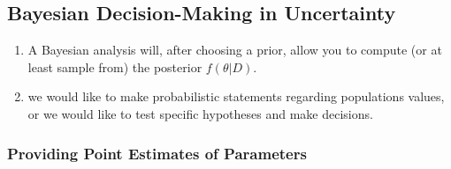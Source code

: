 \subsection{Bayesian Decision-Making in Uncertainty}

\begin{enumerate}
    \item A Bayesian analysis will, after choosing a prior, allow you to compute (or at least sample from) the posterior $f (\theta|D)$. 
    \hfill \cite{statistics/book/Statistics-for-Data-Scientists/Maurits-Kaptein}

    \item we would like to make probabilistic statements regarding populations values, or we would like to test specific hypotheses and make decisions.
    \hfill \cite{statistics/book/Statistics-for-Data-Scientists/Maurits-Kaptein}
\end{enumerate}


\subsubsection{Providing Point Estimates of Parameters}

